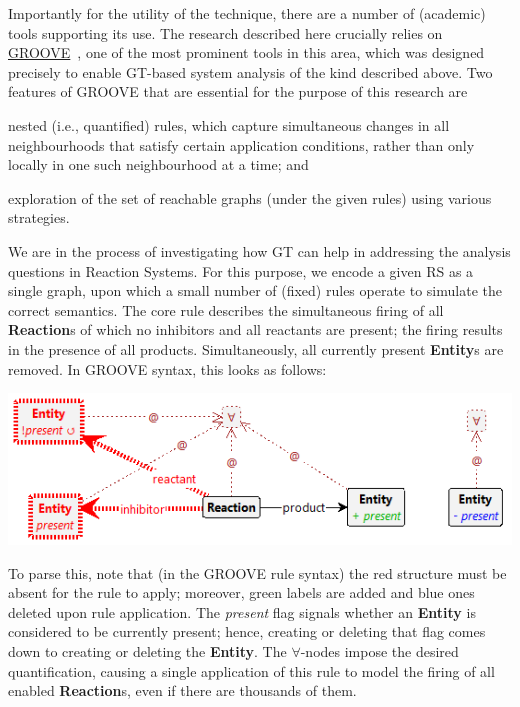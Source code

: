 \documentclass{llncs}
\newcommand{\lab}[1]{\textsf{#1}}
\newcommand{\blab}[1]{\lab{\bfseries #1}}
\newcommand{\ilab}[1]{\lab{\itshape #1}}
\begin{document}
Importantly for the utility of the technique, there are a number of (academic) tools supporting its use. The research described here crucially relies on \href{https://groove.cs.utwente.nl}{GROOVE}~\cite{DBLP:journals/sttt/GhamarianMRZZ12}, one of the most prominent tools in this area, which was designed precisely to enable GT-based system analysis of the kind described above. Two features of GROOVE that are essential for the purpose of this research are
\begin{enumerate*}[label=\emph{(\roman*)}]
\item nested (i.e., quantified) rules, which capture simultaneous changes in all neighbourhoods that satisfy certain application conditions, rather than only locally in one such neighbourhood at a time; and
\item exploration of the set of reachable graphs (under the given rules) using various strategies.
\end{enumerate*}

We are in the process of investigating how GT can help in addressing the analysis questions in Reaction Systems. For this purpose, we encode a given RS as a single graph, upon which a small number of (fixed) rules operate to simulate the correct semantics. The core rule describes the simultaneous firing of all \blab{Reaction}s of which no \lab{inhibitor}s and all \lab{reactant}s are present; the firing results in the presence of all \lab{product}s. Simultaneously, all currently present \blab{Entity}s are removed. In GROOVE syntax, this looks as follows:

\begin{center}
\includegraphics[scale=.49]{react}
\end{center}

To parse this, note that (in the GROOVE rule syntax) the red structure must be absent for the rule to apply; moreover, green labels are added and blue ones deleted upon rule application. The \ilab{present} flag signals whether an \blab{Entity} is considered to be currently present; hence, creating or deleting that flag comes down to creating or deleting the \blab{Entity}. The $\forall$-nodes impose the desired quantification, causing a single application of this rule to model the firing of all enabled \blab{Reaction}s, even if there are thousands of them.
\end{document}
